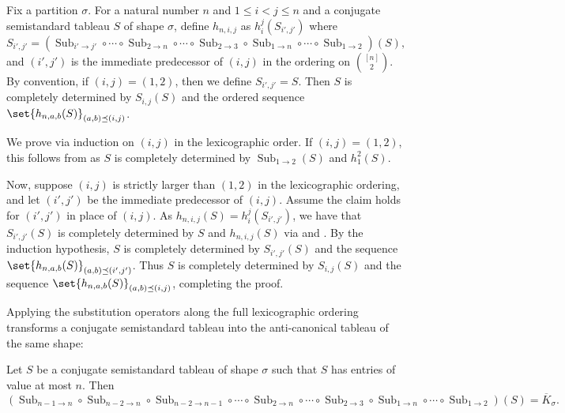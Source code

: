 \documentclass[10pt,a4paper]{amsart}
\DeclareMathOperator{\Sub}{Sub}
\begin{document}
\begin{lem}\label{lem:sub_lex_injective}
    Fix a partition $\sigma$.
    For a natural number $n$ and $1 \leq i < j \leq n$ and a conjugate semistandard tableau $S$ of shape $\sigma$, define $h_{n, i, j}$ as $h_{i}^{j}(S_{i', j'})$ where
    \[
        S_{i', j'} = (\Sub_{i' \to j'} \circ \cdots \circ \Sub_{2 \to n}\circ\cdots\circ\Sub_{2 \to 3} \circ \Sub_{1 \to n} \circ \cdots \circ \Sub_{1 \to 2})(S),
    \]
    and $(i', j')$ is the immediate predecessor of $(i, j)$ in the ordering on $\binom{[n]}{2}$.
    By convention, if $(i, j) = (1, 2)$, then we define $S_{i', j'} = S$.
    Then $S$ is completely determined by $S_{i, j}(S)$ and the ordered sequence $\set{h_{n, a, b}(S)}_{(a, b) \preceq (i, j)}$. 
\end{lem}
\begin{pf}
    We prove via induction on $(i, j)$ in the lexicographic order.
    If $(i, j) = (1, 2)$, this follows from  as $S$ is completely determined by $\Sub_{1 \to 2}(S)$ and $h_{1}^{2}(S)$.
    
    Now, suppose $(i, j)$ is strictly larger than $(1, 2)$ in the lexicographic ordering, and let $(i', j')$ be the immediate predecessor of $(i, j)$. Assume the claim holds for $(i', j')$ in place of $(i,j)$.
    As $h_{n, i, j}(S) = h_{i}^{j}(S_{i', j'})$, we have that $S_{i', j'}(S)$ is completely determined by $S$ and $h_{n, i, j}(S)$ via  and .
    By the induction hypothesis, $S$ is completely determined by $S_{i', j'}(S)$ and the sequence $\set{h_{n, a, b}(S)}_{(a, b) \preceq (i', j')}$.
    Thus $S$ is completely determined by $S_{i, j}(S)$ and the sequence $\set{h_{n, a, b}(S)}_{(a, b) \preceq (i, j)}$, completing the proof.
\end{pf}

Applying the substitution operators along the full lexicographic ordering transforms a conjugate semistandard tableau into the anti-canonical tableau of the same shape:
\begin{lem}\label{lem:sub_anticanonical}
    Let $S$ be a conjugate semistandard tableau of shape $\sigma$ such that $S$ has entries of value at most $n$.
    Then
    \[
        (\Sub_{n - 1 \to n} \circ \Sub_{n - 2 \to n} \circ  \Sub_{n - 2 \to n-1} \circ \cdots \circ \Sub_{2 \to n}\circ\cdots\circ\Sub_{2 \to 3} \circ \Sub_{1 \to n} \circ \cdots \circ \Sub_{1 \to 2})(S) = \overline{K}_\sigma.
    \]
\end{lem}
\end{document}
